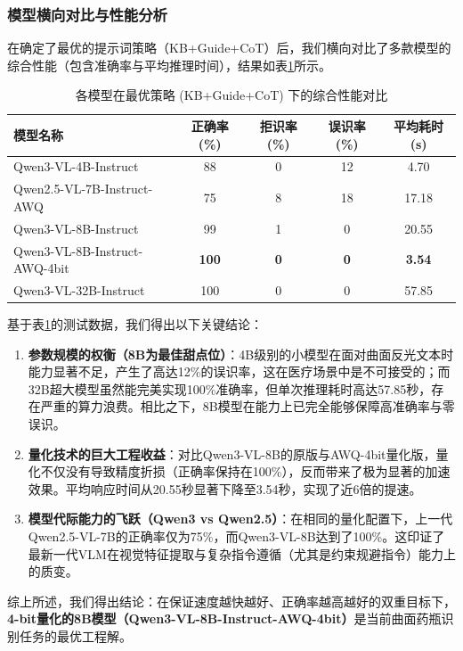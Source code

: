 \documentclass[11pt,a4paper]{ctexart}
\begin{document}
\subsubsection{模型横向对比与性能分析}
在确定了最优的提示词策略（KB+Guide+CoT）后，我们横向对比了多款模型的综合性能（包含准确率与平均推理时间），结果如表\ref{tab:model_cmp}所示。

\begin{table}[h]
\centering
\caption{各模型在最优策略 (KB+Guide+CoT) 下的综合性能对比}
\label{tab:model_cmp}
\begin{tabular}{lcccc}
\toprule
\textbf{模型名称} & \textbf{正确率 (\%)} & \textbf{拒识率 (\%)} & \textbf{误识率 (\%)} & \textbf{平均耗时 (s)} \\
\midrule
Qwen3-VL-4B-Instruct & 88 & 0 & 12 & 4.70 \\
Qwen2.5-VL-7B-Instruct-AWQ & 75 & 8 & 18 & 17.18 \\
Qwen3-VL-8B-Instruct & 99 & 1 & 0 & 20.55 \\
Qwen3-VL-8B-Instruct-AWQ-4bit & \textbf{100} & \textbf{0} & \textbf{0} & \textbf{3.54} \\
Qwen3-VL-32B-Instruct & 100 & 0 & 0 & 57.85 \\
\bottomrule
\end{tabular}
\end{table}

基于表\ref{tab:model_cmp}的测试数据，我们得出以下关键结论：
\begin{enumerate}
    \item \textbf{参数规模的权衡（8B为最佳甜点位）}：4B级别的小模型在面对曲面反光文本时能力显著不足，产生了高达12\%的误识率，这在医疗场景中是不可接受的；而32B超大模型虽然能完美实现100\%准确率，但单次推理耗时高达57.85秒，存在严重的算力浪费。相比之下，8B模型在能力上已完全能够保障高准确率与零误识。
    \item \textbf{量化技术的巨大工程收益}：对比Qwen3-VL-8B的原版与AWQ-4bit量化版，量化不仅没有导致精度折损（正确率保持在100\%），反而带来了极为显著的加速效果。平均响应时间从20.55秒显著下降至3.54秒，实现了近6倍的提速。
    \item \textbf{模型代际能力的飞跃（Qwen3 vs Qwen2.5）}：在相同的量化配置下，上一代Qwen2.5-VL-7B的正确率仅为75\%，而Qwen3-VL-8B达到了100\%。这印证了最新一代VLM在视觉特征提取与复杂指令遵循（尤其是约束规避指令）能力上的质变。
\end{enumerate}

综上所述，我们得出结论：在保证速度越快越好、正确率越高越好的双重目标下，\textbf{4-bit量化的8B模型（Qwen3-VL-8B-Instruct-AWQ-4bit）}是当前曲面药瓶识别任务的最优工程解。
\end{document}
